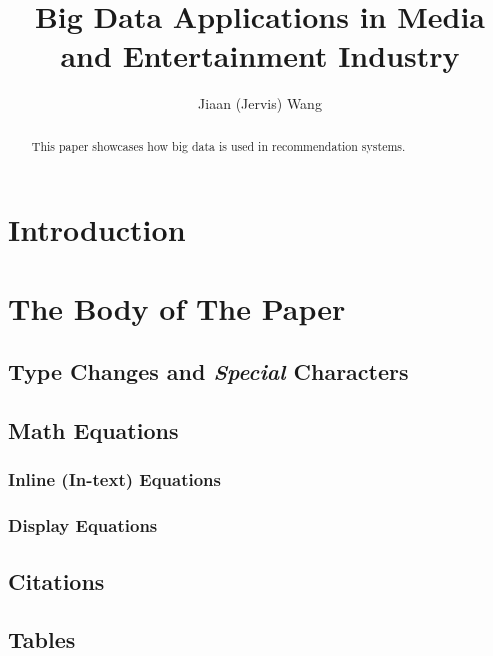 \documentclass[sigconf]{acmart}
\begin{document}
\title{Big Data Applications in Media and Entertainment Industry}


\author{Jiaan (Jervis) Wang}

\begin{abstract}
This paper showcases how big data is used in recommendation systems.
\end{abstract}

\maketitle

\section{Introduction}




\section{The Body of The Paper}

\subsection{Type Changes and {\itshape Special} Characters}

\subsection{Math Equations}

\subsubsection{Inline (In-text) Equations}

\subsubsection{Display Equations}

\subsection{Citations}

\subsection{Tables}
\end{document}
